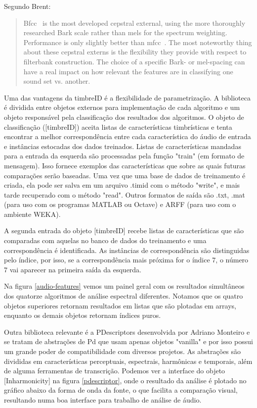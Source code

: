\documentclass[draft]{ppgmus}
\begin{document}
Segundo Brent:

\begin{quotation}
 Bfcc~ is the most developed cepstral external, using the more thoroughly researched Bark scale rather than mels for 
the spectrum weighting. Performance is only slightly better than mfcc~. The most noteworthy thing about these cepstral 
externs is the flexibility they provide with respect to filterbank construction. The choice of a specific Bark- or 
mel-spacing can have a real impact on how relevant the features are in classifying one sound set vs. another.
\end{quotation}


Uma das vantagens da timbreID é a flexibilidade de parametrização. A biblioteca é dividida
entre objetos externos para implementação de cada algoritmo e um objeto responsável pela
classificação dos resultados dos algoritmos. O objeto de classificação ([timbreID]) aceita
listas de características timbrísticas e tenta encontrar a melhor correspondência entre cada 
característica do áudio de entrada e instâncias estocadas dos dados treinados.
Listas de características mandadas para a entrada da esquerda são processadas pela função
"train" (em formato de mensagem). Isso fornece exemplos das características que sobre as quais
futuras comparações serão baseadas. Uma vez que uma base de dados de treinamento é criada, ela
pode ser salva em um arquivo .timid com o método "write", e mais tarde recuperado com o método
"read". Outros formatos de saída são .txt, .mat (para uso com os programas MATLAB ou Octave)
e ARFF (para uso com o ambiente WEKA).

A segunda entrada do objeto [timbreID] recebe listas de características que são comparadas com
aquelas no banco de dados do treinamento e uma correspondência é identificada. As instâncias de 
correspondência são distinguidas pelo índice, por isso, se a correspondência mais próxima for o 
índice 7, o número 7 vai aparecer na primeira saída da esquerda.

Na figura \ref{audio-features} vemos um painel geral com os resultados simultâneos dos quatorze
algoritmos de análise espectral diferentes. Notamos que os quatro objetos superiores retornam resultados em 
listas que são plotadas em arrays, enquanto os demais objetos retornam índices puros.

Outra  biblioteca relevante é a PDescriptors desenvolvida 
por Adriano Monteiro e se tratam
de abstrações de Pd que usam apenas objetos "vanilla" e por isso possui um
grande poder de compatibilidade com diversos projetos. As abstrações
são divididas em características perceptuais, espectrais, harmônicas e temporais, além
de alguma ferramentas de transcrição. Podemos ver a interface do objeto [Inharmonicity\texttildelow]
na figura \ref{pdescriptor}, onde o resultado da análise é plotado no gráfico abaixo da forma de 
onda da fonte, o que facilita a comparação visual, resultando numa boa interface para trabalho de análise de áudio.
\end{document}
